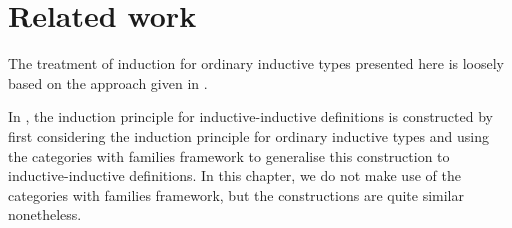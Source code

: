 \section{Related work}

The treatment of induction for ordinary inductive types presented here
is loosely based on the approach given in \cite{Ghani2010}.

In \cite{NordvallForsberg2013}, the induction principle for
inductive-inductive definitions is constructed by first considering
the induction principle for ordinary inductive types and using the
categories with families \cite{Dybjer1995} framework to generalise
this construction to inductive-inductive definitions. In this chapter,
we do not make use of the categories with families framework, but the
constructions are quite similar nonetheless.
